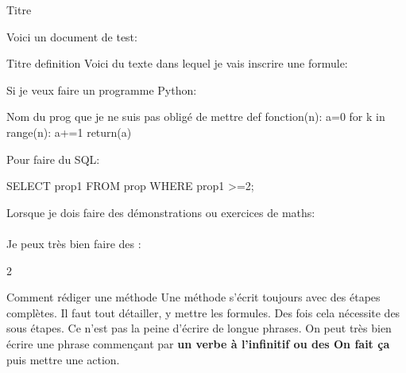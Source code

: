\documentclass{article}
\begin{document}
\pagestyle{fancy}
\fancyhf{}
{\selectfont
\begin{center}
\Huge{Titre} %
\end{center}
Voici un document de test:\\
\begin{definition}{Titre definition}
Voici du texte dans lequel je vais inscrire une formule:
\end{definition}
\noindent Si je veux faire un programme Python:
\begin{prog}{Nom du prog que je ne suis pas obligé de mettre}
def fonction(n):
	a=0
	for k in range(n):
	   a+=1
	return(a)
\end{prog}
\noindent Pour faire du SQL:

\begin{progSQL}{}
SELECT prop1
FROM prop
WHERE prop1 >=2;
\end{progSQL}
\noindent Lorsque je dois faire des démonstrations ou exercices de maths:\\
\\
Je peux très bien faire des :
\begin{multicols}{2}
\begin{méthode}{Comment rédiger une méthode}
Une méthode s'écrit toujours avec des étapes complètes. Il faut tout détailler, y mettre les formules. Des fois cela nécessite des sous étapes. Ce n'est pas la peine d'écrire de longue phrases. On peut très bien écrire une phrase commençant par \textbf{un verbe à l'infinitif ou des On fait ça} puis mettre une action.


\end{méthode}
\end{multicols}}
\end{document}

